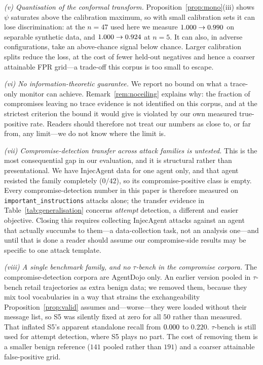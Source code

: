 \documentclass[preprint,12pt,number]{elsarticle}
\theoremstyle{definition}
\begin{document}
\emph{(v) Quantisation of the conformal transform.}
Proposition~\ref{prop:mono}(iii) shows $\psi$ saturates above the calibration
maximum, so with small calibration sets it can lose discrimination: at the $n=47$
used here we measure $1.000 \to 0.990$ on separable synthetic data, and
$1.000 \to 0.924$ at $n=5$. It can also, in adverse configurations, take an above-chance signal below
chance. Larger calibration splits reduce the loss, at the cost of fewer held-out
negatives and hence a coarser attainable FPR grid---a trade-off this corpus is too
small to escape.

\emph{(vi) No information-theoretic guarantee.} We report no bound on what a
trace-only monitor can achieve. Remark~\ref{rem:noceiling} explains why: the
fraction of compromises leaving no trace evidence is not identified on this corpus,
and at the strictest criterion the bound it would give is violated by our own
measured true-positive rate. Readers should therefore not treat our numbers as
close to, or far from, any limit---we do not know where the limit is.

\emph{(vii) Compromise-detection transfer across attack families is untested.}
This is the most consequential gap in our evaluation, and it is structural rather
than presentational. We have InjecAgent data for one agent only, and that agent
resisted the family completely ($0/42$), so its compromise-positive class is empty.
Every compromise-detection number in this paper is therefore measured on
\texttt{important\_instructions} attacks alone; the transfer evidence in
Table~\ref{tab:generalisation} concerns \emph{attempt} detection, a different and
easier objective. Closing this requires collecting InjecAgent attacks against an
agent that actually succumbs to them---a data-collection task, not an analysis
one---and until that is done a reader should assume our compromise-side results may
be specific to one attack template.

\emph{(viii) A single benchmark family, and no $\tau$-bench in the compromise
corpora.} The compromise-detection corpora are AgentDojo only. An earlier version
pooled in $\tau$-bench retail trajectories as extra benign data; we removed them,
because they mix tool vocabularies in a way that strains the exchangeability
Proposition~\ref{prop:valid} assumes and---worse---they were loaded without their
message list, so S5 was silently fixed at zero for all $50$ rather than measured.
That inflated S5's apparent standalone recall from $0.000$ to $0.220$. $\tau$-bench
is still used for attempt detection, where S5 plays no part. The cost of removing
them is a smaller benign reference ($141$ pooled rather than $191$) and a coarser
attainable false-positive grid.
\end{document}
